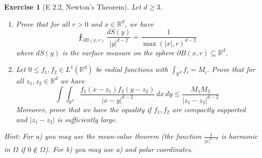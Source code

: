 \documentclass{report}
\theoremstyle{tommy}
\newtheorem{ex}[defn]{Exercise}
\begin{document}
  \begin{ex}[E 2.2, Newton's Theorem]
    Let \(d \ge 3\). 
    \begin{enumerate}[label=\alph*)]
      \item Prove that for all \(r > 0\) and \(x \in \mathbb{R}^d\), we  have \[\fint_{\partial B(x,r)} \frac{dS(y)}{|y|^{d-2}} = \frac{1}{\max(|x|,r)^{d-2}}\]
      where \(dS(y)\) is the surface measure on the sphere \(\partial B(x,r) \subseteq \mathbb{R}^d\).
      \item Let \(0 \le f_1, f_2 \in L^1(\mathbb{R}^d)\) be radial functions with \(\int_{\mathbb{R}^d} f_i = M_i\). Prove that for all \(z_1, z_2 \in \mathbb{R}^d\) we have 
      \[\int \int_{\mathbb{R}^d} \frac{f_1(x-z_1)f_2(y-z_2)}{|x-y|^{d-2}} \, dx \, dy \le \frac{M_1 M_2}{|z_1-z_2|^{d-2}}\]
      Moreover, prove that we have the equality if \(f_1, f_2\) are compactly supported and \(|z_1-z_2|\) is sufficiently large.
    \end{enumerate}
    Hint: For a) you may use the mean-value theorem (the function \(\frac{1}{|x|^{d-2}}\) is harmonic in \(\Omega\) if \(0 \notin \Omega\)). For b) you may use a) and polar coordinates.
  \end{ex}
\end{document}
